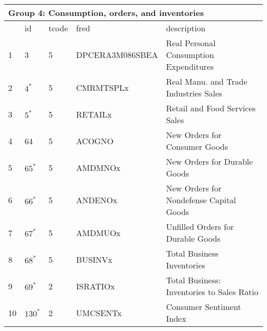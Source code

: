 \begin{table}[ht] 
\centering 
\begin{tabular}{lllll}
\multicolumn{5}{l}{Group 4: Consumption, orders, and inventories} \\
\toprule
 & id & tcode & fred & description \\
\midrule
1 & 3 & 5 & DPCERA3M086SBEA & Real Personal Consumption Expenditures \\
2 & $4^*$ & 5 & CMRMTSPLx & Real Manu. and Trade Industries Sales \\
3 & $5^*$ & 5 & RETAILx & Retail and Food Services Sales \\
\rowcolor{lightgray} 4 & 64 & 5 & ACOGNO & New Orders for Consumer Goods \\
5 & $65^*$ & 5 & AMDMNOx & New Orders for Durable Goods \\
\rowcolor{lightgray} 6 & $66^*$ & 5 & ANDENOx & New Orders for Nondefense Capital Goods \\
7 & $67^*$ & 5 & AMDMUOx & Unfilled Orders for Durable Goods \\
8 & $68^*$ & 5 & BUSINVx & Total Business Inventories \\
9 & $69^*$ & 2 & ISRATIOx & Total Business: Inventories to Sales Ratio \\
\rowcolor{lightgray} 10 & $130^*$ & 2 & UMCSENTx & Consumer Sentiment Index \\
\bottomrule
\end{tabular}  
\end{table} 